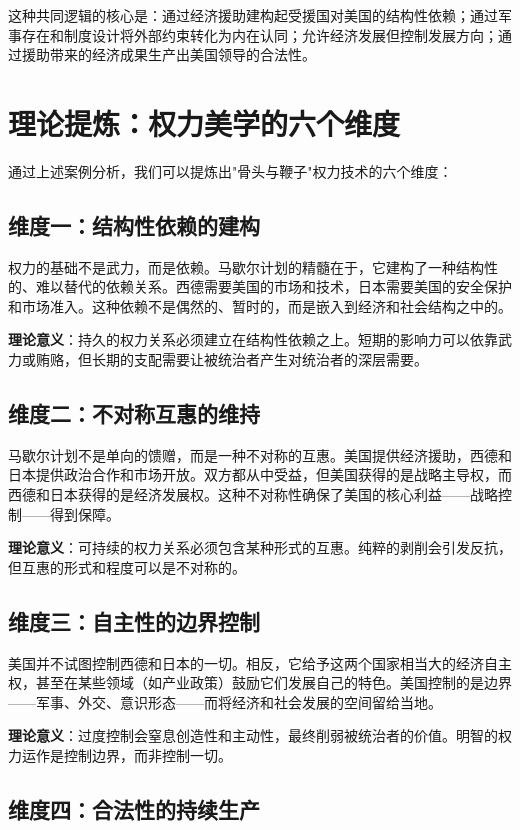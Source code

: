 \documentclass[12pt,a4paper]{article}
\begin{document}
这种共同逻辑的核心是：通过经济援助建构起受援国对美国的结构性依赖；通过军事存在和制度设计将外部约束转化为内在认同；允许经济发展但控制发展方向；通过援助带来的经济成果生产出美国领导的合法性。

\section{理论提炼：权力美学的六个维度}

通过上述案例分析，我们可以提炼出"骨头与鞭子"权力技术的六个维度：

\subsection{维度一：结构性依赖的建构}

权力的基础不是武力，而是依赖。马歇尔计划的精髓在于，它建构了一种结构性的、难以替代的依赖关系。西德需要美国的市场和技术，日本需要美国的安全保护和市场准入。这种依赖不是偶然的、暂时的，而是嵌入到经济和社会结构之中的。

\textbf{理论意义}：持久的权力关系必须建立在结构性依赖之上。短期的影响力可以依靠武力或贿赂，但长期的支配需要让被统治者产生对统治者的深层需要。

\subsection{维度二：不对称互惠的维持}

马歇尔计划不是单向的馈赠，而是一种不对称的互惠。美国提供经济援助，西德和日本提供政治合作和市场开放。双方都从中受益，但美国获得的是战略主导权，而西德和日本获得的是经济发展权。这种不对称性确保了美国的核心利益——战略控制——得到保障。

\textbf{理论意义}：可持续的权力关系必须包含某种形式的互惠。纯粹的剥削会引发反抗，但互惠的形式和程度可以是不对称的。

\subsection{维度三：自主性的边界控制}

美国并不试图控制西德和日本的一切。相反，它给予这两个国家相当大的经济自主权，甚至在某些领域（如产业政策）鼓励它们发展自己的特色。美国控制的是边界——军事、外交、意识形态——而将经济和社会发展的空间留给当地。

\textbf{理论意义}：过度控制会窒息创造性和主动性，最终削弱被统治者的价值。明智的权力运作是控制边界，而非控制一切。

\subsection{维度四：合法性的持续生产}
\end{document}
